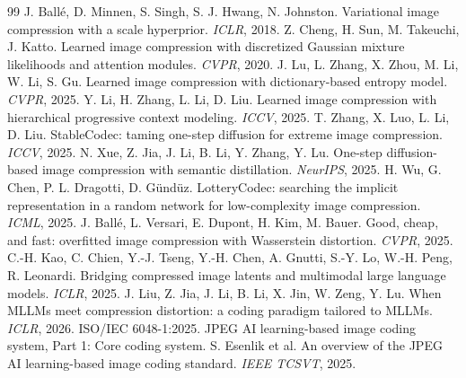 \documentclass[aspectratio=169]{beamer}
\begin{document}
\begin{frame}[t]
  \tiny
  \begin{thebibliography}{99}
     J. Ball\'e, D. Minnen, S. Singh, S. J. Hwang, N. Johnston. Variational image compression with a scale hyperprior. \emph{ICLR}, 2018.
     Z. Cheng, H. Sun, M. Takeuchi, J. Katto. Learned image compression with discretized Gaussian mixture likelihoods and attention modules. \emph{CVPR}, 2020.
     J. Lu, L. Zhang, X. Zhou, M. Li, W. Li, S. Gu. Learned image compression with dictionary-based entropy model. \emph{CVPR}, 2025.
     Y. Li, H. Zhang, L. Li, D. Liu. Learned image compression with hierarchical progressive context modeling. \emph{ICCV}, 2025.
     T. Zhang, X. Luo, L. Li, D. Liu. StableCodec: taming one-step diffusion for extreme image compression. \emph{ICCV}, 2025.
     N. Xue, Z. Jia, J. Li, B. Li, Y. Zhang, Y. Lu. One-step diffusion-based image compression with semantic distillation. \emph{NeurIPS}, 2025.
     H. Wu, G. Chen, P. L. Dragotti, D. G\"und\"uz. LotteryCodec: searching the implicit representation in a random network for low-complexity image compression. \emph{ICML}, 2025.
     J. Ball\'e, L. Versari, E. Dupont, H. Kim, M. Bauer. Good, cheap, and fast: overfitted image compression with Wasserstein distortion. \emph{CVPR}, 2025.
     C.-H. Kao, C. Chien, Y.-J. Tseng, Y.-H. Chen, A. Gnutti, S.-Y. Lo, W.-H. Peng, R. Leonardi. Bridging compressed image latents and multimodal large language models. \emph{ICLR}, 2025.
     J. Liu, Z. Jia, J. Li, B. Li, X. Jin, W. Zeng, Y. Lu. When MLLMs meet compression distortion: a coding paradigm tailored to MLLMs. \emph{ICLR}, 2026.
     ISO/IEC 6048-1:2025. JPEG AI learning-based image coding system, Part 1: Core coding system.
     S. Esenlik et al. An overview of the JPEG AI learning-based image coding standard. \emph{IEEE TCSVT}, 2025.
  \end{thebibliography}
\end{frame}
\end{document}
